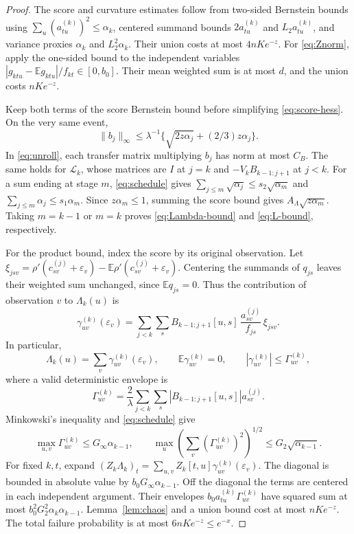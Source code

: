 \documentclass[11pt]{article}
\newcommand{\E}{\mathbb E}
\newcommand{\norm}[1]{\lVert#1\rVert}
\theoremstyle{remark}
\begin{document}
\begin{proof}
The score and curvature estimates follow from two-sided Bernstein bounds
using \(\sum_u(a_{tu}^{(k)})^2\le\alpha_k\), centered summand bounds
\(2a_{tu}^{(k)}\) and \(L_2a_{tu}^{(k)}\), and variance proxies
\(\alpha_k\) and \(L_2^2\alpha_k\). Their union costs at most
\(4nKe^{-z}\). For \eqref{eq:Znorm}, apply the one-sided bound to the
independent variables \(|g_{ktu}-\E g_{ktu}|/f_{kt}\in[0,b_0]\).
Their mean weighted sum is at most \(d\), and the union costs \(nKe^{-z}\).

Keep both terms of the score Bernstein bound before simplifying
\eqref{eq:score-hess}. On the very same event,
\[
 \norm{b_j}_\infty\le\lambda^{-1}
 \{\sqrt{2z\alpha_j}+(2/3)z\alpha_j\}.
\]
In \eqref{eq:unroll}, each transfer matrix multiplying \(b_j\) has norm
at most \(C_B\). The same holds for \(\mathcal L_k\), whose matrices are
\(I\) at \(j=k\) and \(-V_kB_{k-1:j+1}\) at \(j<k\).
For a sum ending at stage \(m\), \eqref{eq:schedule} gives
\(\sum_{j\le m}\sqrt{\alpha_j}\le s_2\sqrt{\alpha_m}\) and
\(\sum_{j\le m}\alpha_j\le s_1\alpha_m\).
Since \(z\alpha_m\le1\), summing the score bound gives
\(A_\Lambda\sqrt{z\alpha_m}\). Taking \(m=k-1\) or \(m=k\)
proves \eqref{eq:Lambda-bound} and \eqref{eq:L-bound}, respectively.

For the product bound, index the score by its original observation.
Let \(\xi_{jsv}=\rho'(c_{sv}^{(j)}+\varepsilon_v)
-\E\rho'(c_{sv}^{(j)}+\varepsilon_v)\). Centering the summands of
\(q_{js}\) leaves their weighted sum unchanged, since \(\E q_{js}=0\).
Thus the contribution of observation \(v\) to \(\Lambda_k(u)\) is
\[
 \gamma_{uv}^{(k)}(\varepsilon_v)=
   \sum_{j<k}\sum_s B_{k-1:j+1}[u,s]\,
       \frac{a_{sv}^{(j)}}{f_{js}}\,\xi_{jsv}.
\]
In particular,
\[
 \Lambda_k(u)=\sum_v\gamma_{uv}^{(k)}(\varepsilon_v),\qquad
 \E\gamma_{uv}^{(k)}=0,\qquad
 |\gamma_{uv}^{(k)}|\le\Gamma_{uv}^{(k)},
\]
where a valid deterministic envelope is
\[
 \Gamma_{uv}^{(k)}
 =\frac2\lambda\sum_{j<k}\sum_s
       |B_{k-1:j+1}[u,s]|a_{sv}^{(j)}.
\]
Minkowski's inequality and \eqref{eq:schedule} give
\[
 \max_{u,v}\Gamma_{uv}^{(k)}\le G_\infty\alpha_{k-1},\qquad
 \max_u\left(\sum_v(\Gamma_{uv}^{(k)})^2\right)^{1/2}
       \le G_2\sqrt{\alpha_{k-1}}.
\]
For fixed \(k,t\), expand \( (Z_k\Lambda_k)_t
=\sum_{u,v}Z_k[t,u]\gamma_{uv}^{(k)}(\varepsilon_v)\).
The diagonal is bounded in absolute value by
\(b_0G_\infty\alpha_{k-1}\).
Off the diagonal the terms are centered in each independent argument.
Their envelopes \(b_0a_{tu}^{(k)}\Gamma_{uv}^{(k)}\) have squared sum at
most \(b_0^2G_2^2\alpha_k\alpha_{k-1}\).
Lemma~\ref{lem:chaos} and a union bound cost at most \(nKe^{-z}\).
The total failure probability is at most \(6nKe^{-z}\le e^{-x}\).
\end{proof}
\end{document}
